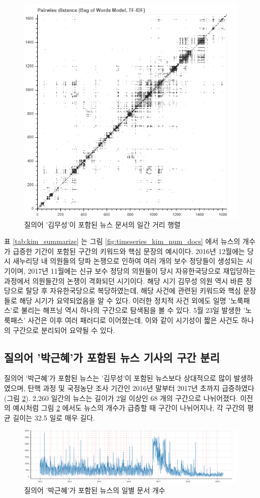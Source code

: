 \documentclass[oneside, ko,phd]{snuthesis_utf8_kor}
\begin{document}
\begin{figure}[H]
\centering
\includegraphics[keepaspectratio=true, width=0.5\linewidth]{fig/timeseries_pairwise_tfidf.png}
\caption{질의어 '김무성'이 포함된 뉴스 문서의 일간 거리 행렬}
\label{fig:timeseries_pairwise_tfidf}
\end{figure}

표 \ref{tab:kim_summarize} 는 그림 \ref{fig:timeseries_kim_num_docs} 에서 뉴스의 개수가 급증한 기간이 포함된 구간의 키워드와 핵심 문장의 예시이다.
2016년 12월에는 당시 새누리당 내 의원들의 당파 논쟁으로 인하여 여러 개의 보수 정당들이 생성되는 시기이며, 2017년 11월에는 신규 보수 정당의 의원들이 당시 자유한국당으로 재입당하는 과정에서 의원들간의 논쟁이 격화되던 시기이다.
해당 시기 김무성 의원 역시 바른 정당으로 탈당 후 자유한국당으로 복당하였는데, 해당 사건에 관련된 키워드와 핵심 문장들로 해당 시기가 요약되었음을 알 수 있다.
이러한 정치적 사건 외에도 일명 '노룩패스'로 불리는 해프닝 역시 하나의 구간으로 탐색됨을 볼 수 있다.
5월 23일 발생한 '노룩패스' 사건은 이후 여러 패러디로 이어졌는데, 이와 같이 시기성이 짧은 사건도 하나의 구간으로 분리되어 요약될 수 있다.

\subsection{질의어 '박근혜'가 포함된 뉴스 기사의 구간 분리}

질의어 '박근혜'가 포함된 뉴스는 '김무성'이 포함된 뉴스보다 상대적으로 많이 발생하였으며, 탄핵 과정 및 국정농단 조사 기간인 2016년 말부터 2017년 초까지 급증하였다 (그림 \ref{fig:timeseries_park_num_docs}).
2,260 일간의 뉴스는 길이가 2일 이상인 68 개의 구간으로 나뉘어졌다.
이전의 예시처럼 그림 \ref{fig:timeseries_park_num_docs} 에서도 뉴스의 개수가 급증할 때 구간이 나뉘어지나, 각 구간의 평균 길이는 32.5 일로 매우 길다.

\begin{figure}[H]
\centering
\includegraphics[keepaspectratio=true, width=0.9\linewidth]{fig/timeseries_park_num_docs.png}
\caption{질의어 '박근혜'가 포함된 뉴스의 일별 문서 개수}
\label{fig:timeseries_park_num_docs}
\end{figure}
\end{document}
